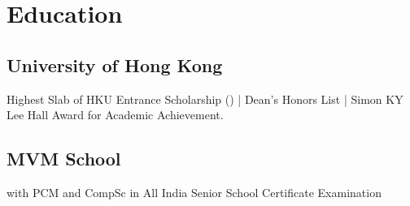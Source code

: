\documentclass[]{deedy-resume-openfont}
\begin{document}
\begin{minipage}[t]{0.35\textwidth} 


\section{Education} 

\subsection{University of Hong Kong}
{Highest Slab of HKU Entrance Scholarship () |}
{Dean's Honors List | }{ Simon KY Lee Hall Award for Academic Achievement.}

\sectionsep

\subsection{MVM School}
{\textbf{} with PCM and CompSc in All India Senior School Certificate Examination }
\sectionsep


\end{minipage}
\end{document}
